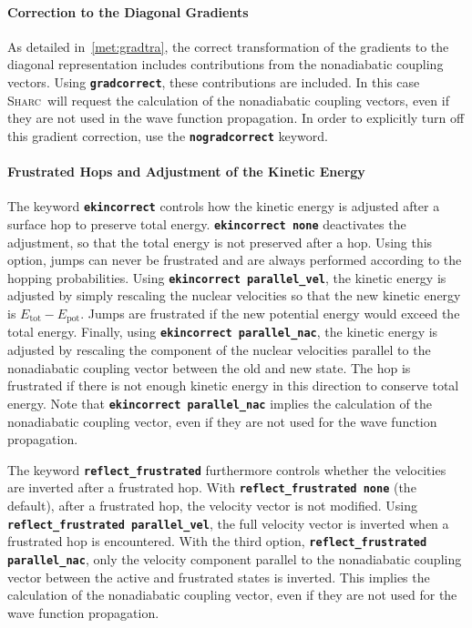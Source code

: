 \documentclass[a4paper,10pt,DIV=15,openany]{scrbook}
\newcommand{\sharc}{\textsc{Sharc}}
\newcommand{\ttt}[1]{\textbf{\texttt{#1}}}
\begin{document}
\paragraph{Correction to the Diagonal Gradients}

As detailed in~\ref{met:gradtra}, the correct transformation of the gradients to the diagonal representation includes contributions from the nonadiabatic coupling vectors. Using \ttt{gradcorrect}, these contributions are included. In this case \sharc\ will request the calculation of the nonadiabatic coupling vectors, even if they are not used in the wave function propagation. In order to explicitly turn off this gradient correction, use the \ttt{nogradcorrect} keyword.

\paragraph{Frustrated Hops and Adjustment of the Kinetic Energy}

The keyword \ttt{ekincorrect} controls how the kinetic energy is adjusted after a surface hop to preserve total energy. \ttt{ekincorrect none} deactivates the adjustment, so that the total energy is not preserved after a hop. Using this option, jumps can never be frustrated and are always performed according to the hopping probabilities. 
Using \ttt{ekincorrect parallel\_vel}, the kinetic energy is adjusted by simply rescaling the nuclear velocities so that the new kinetic energy is $E_{\text{tot}}-E_{\text{pot}}$. Jumps are frustrated if the new potential energy would exceed the total energy.
Finally, using \ttt{ekincorrect parallel\_nac}, the kinetic energy is adjusted by rescaling the component of the nuclear velocities parallel to the nonadiabatic coupling vector between the old and new state. The hop is frustrated if there is not enough kinetic energy in this direction to conserve total energy. Note that \ttt{ekincorrect parallel\_nac} implies the calculation of the nonadiabatic coupling vector, even if they are not used for the wave function propagation.

The keyword \ttt{reflect\_frustrated} furthermore controls whether the velocities are inverted after a frustrated hop.
With \ttt{reflect\_frustrated none} (the default), after a frustrated hop, the velocity vector is not modified.
Using \ttt{reflect\_frustrated parallel\_vel}, the full velocity vector is inverted when a frustrated hop is encountered.
With the third option, \ttt{reflect\_frustrated parallel\_nac}, only the velocity component parallel to the nonadiabatic coupling vector between the active and frustrated states is inverted. This implies the calculation of the nonadiabatic coupling vector, even if they are not used for the wave function propagation.
\end{document}
